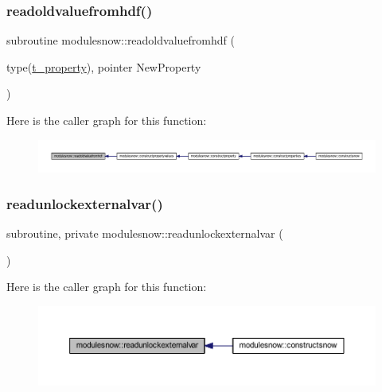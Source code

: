 \subsubsection{\texorpdfstring{readoldvaluefromhdf()}{readoldvaluefromhdf()}}
{\footnotesize\ttfamily subroutine modulesnow\+::readoldvaluefromhdf (\begin{DoxyParamCaption}\item[{type(\mbox{\hyperlink{structmodulesnow_1_1t__property}{t\+\_\+property}}), pointer}]{New\+Property }\end{DoxyParamCaption})\hspace{0.3cm}{\ttfamily [private]}}

Here is the caller graph for this function\+:\nopagebreak
\begin{figure}[H]
\begin{center}
\leavevmode
\includegraphics[width=350pt]{namespacemodulesnow_af891ed4f018c66ced7868c95013229f2_icgraph}
\end{center}
\end{figure}
\mbox{\label{namespacemodulesnow_aca134562eba09bf793fd35d399482672}} 
\subsubsection{\texorpdfstring{readunlockexternalvar()}{readunlockexternalvar()}}
{\footnotesize\ttfamily subroutine, private modulesnow\+::readunlockexternalvar (\begin{DoxyParamCaption}{ }\end{DoxyParamCaption})\hspace{0.3cm}{\ttfamily [private]}}

Here is the caller graph for this function\+:\nopagebreak
\begin{figure}[H]
\begin{center}
\leavevmode
\includegraphics[width=350pt]{namespacemodulesnow_aca134562eba09bf793fd35d399482672_icgraph}
\end{center}
\end{figure}
\mbox{\label{namespacemodulesnow_a63b7009f3649ad5fe78d70607da94054}} 

